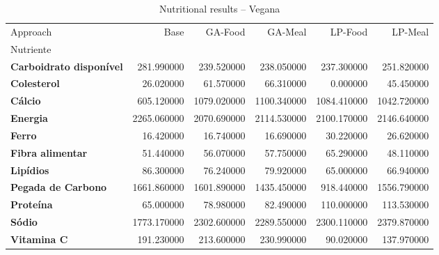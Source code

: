 \begin{table}
\caption{Nutritional results -- Vegana}
\label{tab:vegana}
\begin{tabular}{lrrrrr}
\toprule
Approach & Base & GA-Food & GA-Meal & LP-Food & LP-Meal \\
Nutriente &  &  &  &  &  \\
\midrule
\textbf{Carboidrato disponível} & 281.990000 & 239.520000 & 238.050000 & 237.300000 & 251.820000 \\
\textbf{Colesterol} & 26.020000 & 61.570000 & 66.310000 & 0.000000 & 45.450000 \\
\textbf{Cálcio} & 605.120000 & 1079.020000 & 1100.340000 & 1084.410000 & 1042.720000 \\
\textbf{Energia} & 2265.060000 & 2070.690000 & 2114.530000 & 2100.170000 & 2146.640000 \\
\textbf{Ferro} & 16.420000 & 16.740000 & 16.690000 & 30.220000 & 26.620000 \\
\textbf{Fibra alimentar} & 51.440000 & 56.070000 & 57.750000 & 65.290000 & 48.110000 \\
\textbf{Lipídios} & 86.300000 & 76.240000 & 79.920000 & 65.000000 & 66.940000 \\
\textbf{Pegada de Carbono} & 1661.860000 & 1601.890000 & 1435.450000 & 918.440000 & 1556.790000 \\
\textbf{Proteína} & 65.000000 & 78.980000 & 82.490000 & 110.000000 & 113.530000 \\
\textbf{Sódio} & 1773.170000 & 2302.600000 & 2289.550000 & 2300.110000 & 2379.870000 \\
\textbf{Vitamina C} & 191.230000 & 213.600000 & 230.990000 & 90.020000 & 137.970000 \\
\bottomrule
\end{tabular}
\end{table}

